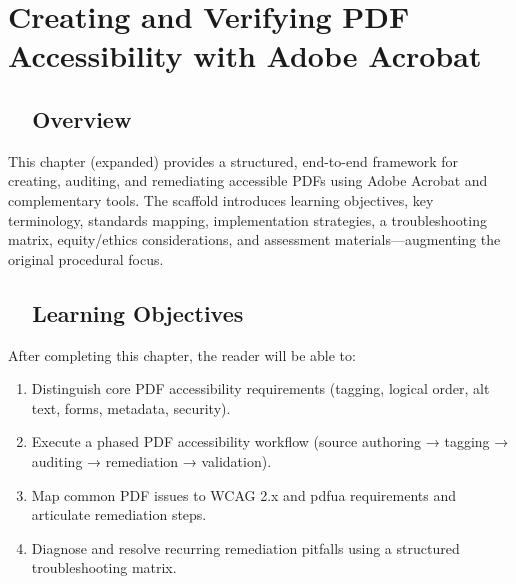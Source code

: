\chapter{Creating and Verifying PDF Accessibility with Adobe Acrobat}


\section{~~Overview}\label{ch17:sec:overview-expanded}
This chapter (expanded) provides a structured, end-to-end framework for creating, auditing, and remediating accessible PDFs using Adobe Acrobat and complementary tools. The scaffold introduces learning objectives, key terminology, standards mapping, implementation strategies, a troubleshooting matrix, equity/ethics considerations, and assessment materials—augmenting the original procedural focus.

\section{~~Learning Objectives}\label{ch17:sec:learning-objectives}
After completing this chapter, the reader will be able to:
\begin{enumerate}
	\item Distinguish core PDF accessibility requirements (tagging, logical order, alt text, forms, metadata, security).
	\item Execute a phased PDF accessibility workflow (source authoring → tagging → auditing → remediation → validation).
	\item Map common PDF issues to WCAG 2.x and \gls{pdfua} requirements and articulate remediation steps.
	\item Diagnose and resolve recurring remediation pitfalls using a structured troubleshooting matrix.
\end{enumerate}


